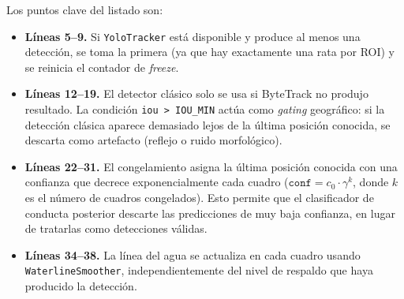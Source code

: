 Los puntos clave del listado son:

\begin{itemize}
    \item \textbf{Líneas 5--9.} Si \texttt{YoloTracker} está disponible y
    produce al menos una detección, se toma la primera (ya que hay exactamente
    una rata por ROI) y se reinicia el contador de \textit{freeze}.

    \item \textbf{Líneas 12--19.} El detector clásico solo se usa si
    ByteTrack no produjo resultado. La condición \texttt{iou > IOU\_MIN}
    actúa como \textit{gating} geográfico: si la detección clásica aparece
    demasiado lejos de la última posición conocida, se descarta como
    artefacto (reflejo o ruido morfológico).

    \item \textbf{Líneas 22--31.} El congelamiento asigna la última posición
    conocida con una confianza que decrece exponencialmente cada cuadro
    ($\texttt{conf} = c_0 \cdot \gamma^{k}$, donde $k$ es el número de
    cuadros congelados). Esto permite que el clasificador de conducta posterior
    descarte las predicciones de muy baja confianza, en lugar de tratarlas
    como detecciones válidas.

    \item \textbf{Líneas 34--38.} La línea del agua se actualiza en cada
    cuadro usando \texttt{WaterlineSmoother}, independientemente del nivel
    de respaldo que haya producido la detección.
\end{itemize}


%
%
%
%
